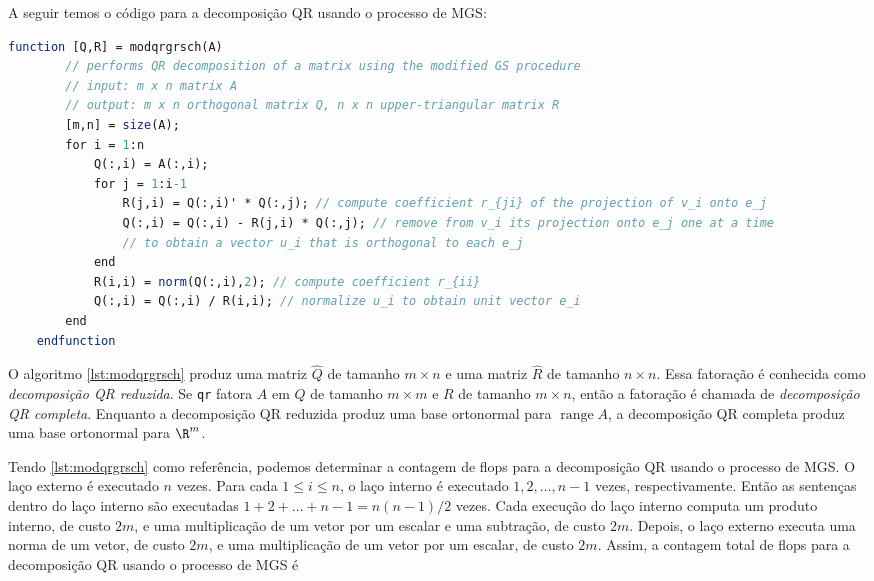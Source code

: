 \documentclass{article}
\DeclareMathOperator{\range}{range}
\begin{document}
A seguir temos o código para a decomposição QR usando o processo de MGS:

\begin{lstlisting}[language=Scilab, caption=Decomposição QR usando Gram-Schmidt modificado, label=lst:modqrgrsch]
    function [Q,R] = modqrgrsch(A)
        // performs QR decomposition of a matrix using the modified GS procedure
        // input: m x n matrix A
        // output: m x n orthogonal matrix Q, n x n upper-triangular matrix R
        [m,n] = size(A);
        for i = 1:n
            Q(:,i) = A(:,i);
            for j = 1:i-1
                R(j,i) = Q(:,i)' * Q(:,j); // compute coefficient r_{ji} of the projection of v_i onto e_j
                Q(:,i) = Q(:,i) - R(j,i) * Q(:,j); // remove from v_i its projection onto e_j one at a time
                // to obtain a vector u_i that is orthogonal to each e_j
            end
            R(i,i) = norm(Q(:,i),2); // compute coefficient r_{ii}
            Q(:,i) = Q(:,i) / R(i,i); // normalize u_i to obtain unit vector e_i
        end
    endfunction
\end{lstlisting}

\begin{rem}
    O algoritmo \cref{lst:modqrgrsch} produz uma matriz \(\hat{Q}\) de tamanho \(m \times n\) e uma matriz \(\hat{R}\) de tamanho \(n \times n\). Essa fatoração é conhecida como \emph{decomposição QR reduzida}. Se \texttt{qr} fatora \(A\) em \(Q\) de tamanho \(m \times m\) e \(R\) de tamanho \(m \times n\), então a fatoração é chamada de \emph{decomposição QR completa}. Enquanto a decomposição QR reduzida produz uma base ortonormal para \(\range A\), a decomposição QR completa produz uma base ortonormal para \(\R^m\).
\end{rem}

Tendo \cref{lst:modqrgrsch} como referência, podemos determinar a contagem de flops para a decomposição QR usando o processo de MGS. O laço externo é executado \(n\) vezes. Para cada \(1 \leq i \leq n\), o laço interno é executado \(1, 2, \ldots, n-1\) vezes, respectivamente. Então as sentenças dentro do laço interno são executadas \(1 + 2 + \ldots + n-1 = n(n-1)/2\) vezes. Cada execução do laço interno computa um produto interno, de custo \(2m\), e uma multiplicação de um vetor por um escalar e uma subtração, de custo \(2m\). Depois, o laço externo executa uma norma de um vetor, de custo \(2m\), e uma multiplicação de um vetor por um escalar, de custo \(2m\). Assim, a contagem total de flops para a decomposição QR usando o processo de MGS é
\end{document}
